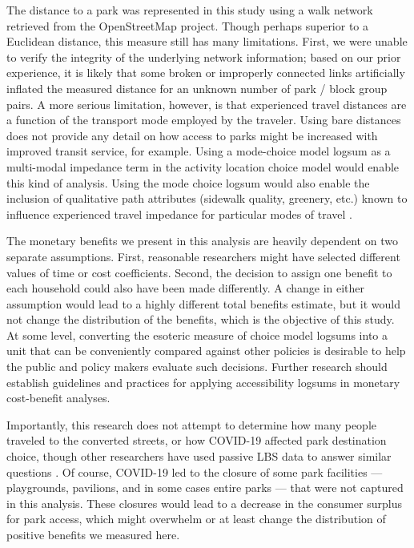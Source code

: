 \documentclass[3p, authoryear, review]{elsarticle} %
\begin{document}
The distance to a park was represented in this study using a walk network
retrieved from the OpenStreetMap project. Though perhaps superior to a Euclidean
distance, this measure still has many limitations. First, we were unable to
verify the integrity of the underlying network information; based on our prior
experience, it is likely that some broken or improperly connected links
artificially inflated the measured distance for an unknown number of park /
block group pairs. A more serious limitation, however, is that experienced
travel distances are a function of the transport mode employed by the traveler.
Using bare distances does not provide any detail on how access to parks might be
increased with improved transit service, for example. Using a mode-choice model
logsum as a multi-modal impedance term in the activity location choice model
would enable this kind of analysis. Using the mode choice logsum would also
enable the inclusion of
qualitative path attributes (sidewalk quality, greenery, etc.) known to
influence experienced travel impedance for particular modes of travel \citep{clifton2016}.

The monetary benefits we present in this analysis are heavily dependent on
two separate assumptions. First, reasonable researchers might have selected
different values of time or cost coefficients. Second, the decision to assign
one benefit to each household could also have been made
differently. A change in either assumption would lead to a highly different
total benefits estimate, but it would not change the distribution of the
benefits, which is the objective of this study. At some level, converting the
esoteric measure of choice model logsums into a unit that can be conveniently
compared against other policies is desirable to help the public and policy
makers evaluate such decisions. Further research should establish guidelines and
practices for applying accessibility logsums in monetary cost-benefit analyses.

Importantly, this research does not attempt to determine how many people
traveled to the converted streets, or how COVID-19 affected park destination
choice, though other researchers have used passive LBS data to answer similar
questions \citep{doucette}.
Of course, COVID-19 led to the closure of some park facilities --- playgrounds,
pavilions, and in some cases entire parks --- that were not captured in this
analysis. These closures would lead to a decrease in the consumer surplus for
park access, which might overwhelm or at least change the distribution of
positive benefits we measured here.
\end{document}
